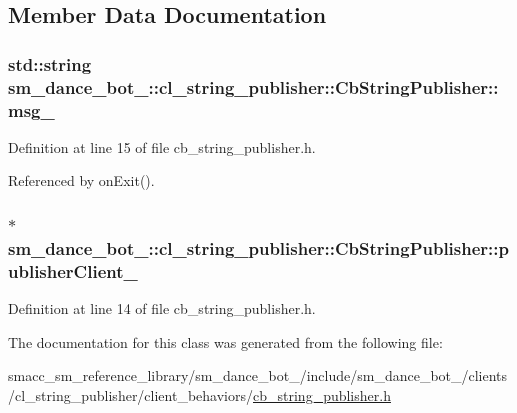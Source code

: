 \subsection{Member Data Documentation}
\subsubsection[{\texorpdfstring{msg\+\_\+}{msg_}}]{\setlength{\rightskip}{0pt plus 5cm}std\+::string sm\+\_\+dance\+\_\+bot\+\_\+::cl\+\_\+string\+\_\+publisher\+::\+Cb\+String\+Publisher\+::msg\+\_\+}\hypertarget{classsm__dance__bot__3_1_1cl__string__publisher_1_1CbStringPublisher_a2a5852f61ef2db0fa430b4fcc00ce2c3}{}\label{classsm__dance__bot__3_1_1cl__string__publisher_1_1CbStringPublisher_a2a5852f61ef2db0fa430b4fcc00ce2c3}


Definition at line 15 of file cb\+\_\+string\+\_\+publisher.\+h.



Referenced by on\+Exit().

\subsubsection[{\texorpdfstring{publisher\+Client\+\_\+}{publisherClient_}}]{$\ast$ sm\+\_\+dance\+\_\+bot\+\_\+::cl\+\_\+string\+\_\+publisher\+::\+Cb\+String\+Publisher\+::publisher\+Client\+\_\+}\hypertarget{classsm__dance__bot__3_1_1cl__string__publisher_1_1CbStringPublisher_a0ad09eb431850dcefcb364904d56e6eb}{}\label{classsm__dance__bot__3_1_1cl__string__publisher_1_1CbStringPublisher_a0ad09eb431850dcefcb364904d56e6eb}


Definition at line 14 of file cb\+\_\+string\+\_\+publisher.\+h.



The documentation for this class was generated from the following file\+:\begin{DoxyCompactItemize}
\item 
smacc\+\_\+sm\+\_\+reference\+\_\+library/sm\+\_\+dance\+\_\+bot\+\_/include/sm\+\_\+dance\+\_\+bot\+\_/clients/cl\+\_\+string\+\_\+publisher/client\+\_\+behaviors/\hyperlink{3_2include_2sm__dance__bot__3_2clients_2cl__string__publisher_2client__behaviors_2cb__string__publisher_8h}{cb\+\_\+string\+\_\+publisher.\+h}\end{DoxyCompactItemize}
